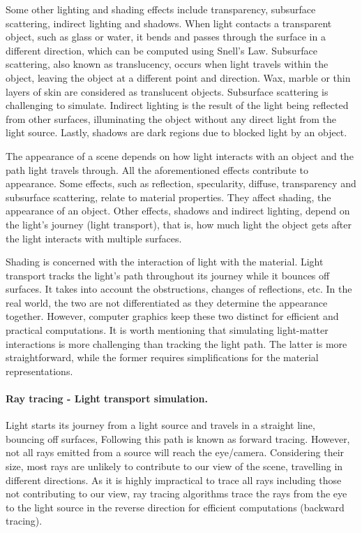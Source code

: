 Some other lighting and shading effects include transparency, subsurface scattering, indirect lighting and shadows. When light contacts a transparent object, such as glass or water, it bends and passes through the surface in a different direction, which can be computed using Snell's Law. Subsurface scattering, also known as translucency, occurs when light travels within the object, leaving the object at a different point and direction. Wax, marble or thin layers of skin are considered as translucent objects. Subsurface scattering is challenging to simulate. Indirect lighting is the result of the light being reflected from other surfaces, illuminating the object without any direct light from the light source. Lastly, shadows are dark regions due to blocked light by an object. 

The appearance of a scene depends on how light interacts with an object and the path light travels through. All the aforementioned effects contribute to appearance. Some effects, such as reflection, specularity, diffuse, transparency and subsurface scattering, relate to material properties. They affect shading, the appearance of an object. Other effects, shadows and indirect lighting, depend on the light's journey (light transport), that is, how much light the object gets after the light interacts with multiple surfaces. 

Shading is concerned with the interaction of light with the material. Light transport tracks the light's path throughout its journey while it bounces off surfaces. It takes into account the obstructions, changes of reflections, etc. In the real world, the two are not differentiated as they determine the appearance together. However, computer graphics keep these two distinct for efficient and practical computations. It is worth mentioning that simulating light-matter interactions is more challenging than tracking the light path. The latter is more straightforward, while the former requires simplifications for the material representations.



\paragraph{Ray tracing - Light transport simulation.}

Light starts its journey from a light source and travels in a straight line, bouncing off surfaces, Following this path is known as forward tracing. However, not all rays emitted from a source will reach the eye/camera. Considering their size, most rays are unlikely to contribute to our view of the scene, travelling in different directions. As it is highly impractical to trace all rays including those not contributing to our view, ray tracing algorithms trace the rays from the eye to the light source in the reverse direction for efficient computations (backward tracing).

